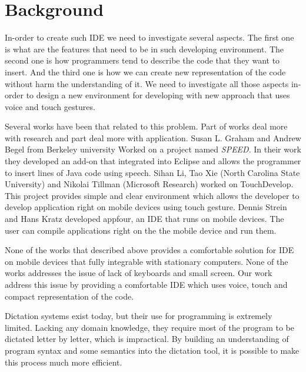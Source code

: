 \section{Background}
In-order to create such IDE we need to investigate several aspects. The first one is what are the features that need to be in such developing environment. The second one is how programmers tend to describe the code that they want to insert. And the third one is how we can create new representation of the code without harm the understanding of it. We need to investigate all those aspects in-order to design a new environment for developing with new approach that uses voice and touch gestures.

Several works have been that related to this problem. Part of works deal more with research and part deal more with application. Susan L. Graham and Andrew Begel from Berkeley university Worked on a project named \textit{SPEED}. In their work they developed an add-on that integrated into Eclipse and allows the programmer to insert lines of Java code using speech. Sihan Li, Tao Xie (North Carolina State University) and Nikolai Tillman (Microsoft Research) worked on TouchDevelop. This project provides simple and clear environment which allows the developer to develop application right on mobile devices using touch gesture. Dennis Strein and Hans Kratz developed appfour, an IDE that runs on mobile devices. The user can compile applications right on the the mobile device and run them.

None of the works that described above provides a comfortable solution for IDE on mobile devices that fully integrable with stationary computers. None of the works addresses the issue of lack of keyboards and small screen. 	Our work address this issue by providing a comfortable IDE which uses voice, touch and compact representation of the code.

Dictation systems exist today, but their use for programming is extremely limited. Lacking any domain knowledge, they require most of the program to be dictated letter by letter, which is impractical. By building an understanding of program syntax and some semantics into the dictation tool, it is possible to make this process much more efficient.

